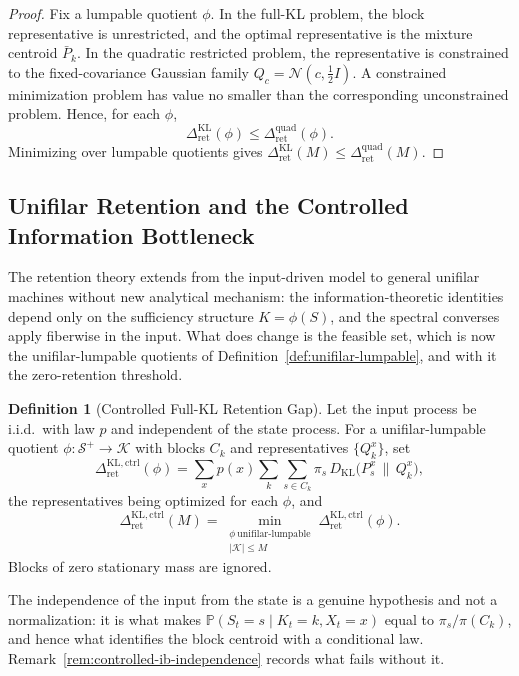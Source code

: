 \documentclass[12pt]{article}
\theoremstyle{definition}
\newtheorem{definition}[theorem]{Definition}
\newcommand{\RetKL}{\Delta_{\mathrm{ret}}^{\mathrm{KL}}}
\newcommand{\RetQuad}{\Delta_{\mathrm{ret}}^{\mathrm{quad}}}
\newcommand{\Splus}{\mathcal S^{+}}
\newcommand{\RetKLc}{\Delta_{\mathrm{ret}}^{\mathrm{KL,ctrl}}}
\begin{document}
\begin{proof}
Fix a lumpable quotient $\phi$.  In the full-KL problem, the block
representative is unrestricted, and the optimal representative is the mixture
centroid $\bar P_k$.  In the quadratic restricted problem, the representative
is constrained to the fixed-covariance Gaussian family
$Q_c=\mathcal N(c,\tfrac12 I)$.  A constrained minimization problem has value
no smaller than the corresponding unconstrained problem.  Hence, for each
$\phi$,
\[
\RetKL(\phi)\le \RetQuad(\phi).
\]
Minimizing over lumpable quotients gives $\RetKL(M)\le \RetQuad(M)$.
\end{proof}

\subsection{Unifilar Retention and the Controlled Information Bottleneck}
\label{subsec:unifilar-retention}

The retention theory extends from the input-driven model to general unifilar
machines without new analytical mechanism: the information-theoretic identities
depend only on the sufficiency structure $K=\phi(S)$, and the spectral
converses apply fiberwise in the input.  What does change is the feasible set,
which is now the unifilar-lumpable quotients of
Definition~\ref{def:unifilar-lumpable}, and with it the zero-retention
threshold.

\begin{definition}[Controlled Full-KL Retention Gap]
\label{def:controlled-full-kl}
Let the input process be i.i.d.\ with law $p$ and independent of the state
process.  For a unifilar-lumpable quotient $\phi:\Splus\to\mathcal K$ with
blocks $C_k$ and representatives $\{Q_k^x\}$, set
\[
\RetKLc(\phi)
=
\sum_xp(x)\sum_k\sum_{s\in C_k}\pi_s\,
D_{\mathrm{KL}}\bigl(P_s^x\,\big\|\,Q_k^x\bigr),
\]
the representatives being optimized for each $\phi$, and
\[
\RetKLc(M)
=
\min_{\substack{\phi\ \text{unifilar-lumpable}\\ |\mathcal K|\le M}}
\RetKLc(\phi).
\]
Blocks of zero stationary mass are ignored.
\end{definition}

The independence of the input from the state is a genuine hypothesis and not a
normalization: it is what makes $\mathbb P(S_t=s\mid K_t=k,X_t=x)$ equal to
$\pi_s/\pi(C_k)$, and hence what identifies the block centroid with a
conditional law.  Remark~\ref{rem:controlled-ib-independence} records what
fails without it.
\end{document}
